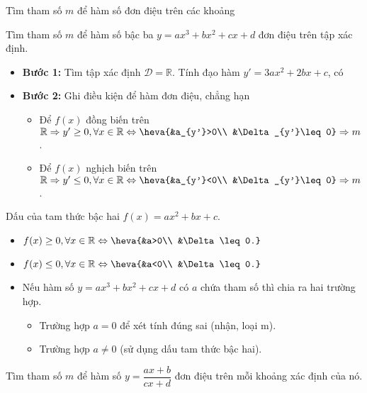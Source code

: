 \begin{dang}{Tìm tham số $m$ để hàm số đơn điệu trên các khoảng}
 \begin{listEX}
 \item Tìm tham số $m$ để hàm số bậc ba $y=ax^3+bx^2+cx+d$ đơn điệu trên tập xác định.
 \begin{itemize}
 \item \textbf{Bước 1:} Tìm tập xác định $\mathscr{D}=\mathbb{R}$. Tính đạo hàm $y'=3a x^2+2b x+c$, có 
 \item \textbf{Bước 2:} Ghi điều kiện để hàm đơn điệu, chẳng hạn
 \begin{itemize}
 \item Để $f (x)$ đồng biến trên $\mathbb{R}\Rightarrow y'\geq 0,\forall x\in\mathbb{R}\Leftrightarrow\heva{&a_{y'}>0\\ &\Delta_{y'}\leq 0}\Rightarrow m$.
 \item Để $f (x)$ nghịch biến trên $\mathbb{R}\Rightarrow y'\leq 0,\forall x\in\mathbb{R}\Leftrightarrow\heva{&a_{y'}<0\\ &\Delta_{y'}\leq 0}\Rightarrow m $.
 \end{itemize}
 \end{itemize}
 \begin{note}
 Dấu của tam thức bậc hai $f(x)=a x^2+bx+c$.
 \begin{multicols}{2}
 \begin{itemize}
 \item $f(x)\geq 0,\forall x\in\mathbb{R}\Leftrightarrow\heva{&a>0\\ &\Delta\leq 0.}$
 \item $f(x)\leq 0,\forall x\in\mathbb{R}\Leftrightarrow\heva{&a<0\\ &\Delta\leq 0.}$
 \end{itemize}
 \end{multicols}
 \begin{itemize}
 \item Nếu hàm số $y=a x^3+b x^2+c x+d$ có $a$ chứa tham số thì chia ra hai trường hợp.
 \begin{itemize}
 \item Trường hợp $a = 0$ để xét tính đúng sai (nhận, loại m).
 \item Trường hợp $a\ne 0$ (sử dụng dấu tam thức bậc hai).
 \end{itemize}
 \end{itemize}
 \end{note}
 \item Tìm tham số $m$ để hàm số $y=\dfrac{ax+b}{cx+d}$ đơn điệu trên mỗi khoảng xác định của nó.

\end{listEX}
\end{dang}
